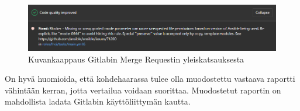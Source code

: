 \begin{figure}[h!]
    \includegraphics[width=\textwidth]{figures/gitlab-code-quality-improved}
    \caption{Kuvankaappaus Gitlabin Merge Requestin yleiskatsauksesta}
    \label{fig:gitlab-code-quality-improved}
\end{figure}

On hyvä huomioida, että kohdehaarassa tulee olla muodostettu vastaava raportti
vähintään kerran, jotta vertailua voidaan suorittaa. Muodostetut raportin on
mahdollista ladata Gitlabin käyttöliittymän kautta.\parencite{GitlabCICDDocs}
